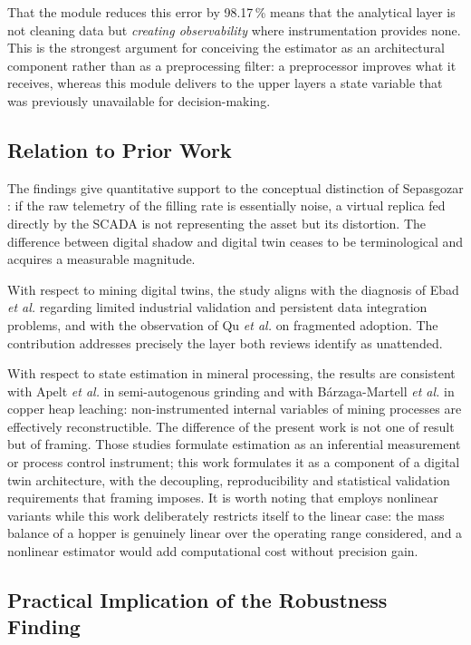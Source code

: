 \documentclass[conference]{IEEEtran}
\begin{document}
That the module reduces this error by 98.17\,\% means that the analytical layer
is not cleaning data but \emph{creating observability} where instrumentation
provides none. This is the strongest argument for conceiving the estimator as an
architectural component rather than as a preprocessing filter: a preprocessor
improves what it receives, whereas this module delivers to the upper layers a
state variable that was previously unavailable for decision-making.

\subsection{Relation to Prior Work}

The findings give quantitative support to the conceptual distinction of
Sepasgozar \cite{sepasgozar2021}: if the raw telemetry of the filling rate is
essentially noise, a virtual replica fed directly by the SCADA is not
representing the asset but its distortion. The difference between digital shadow
and digital twin ceases to be terminological and acquires a measurable
magnitude.

With respect to mining digital twins, the study aligns with the diagnosis of
Ebad \textit{et al.} \cite{ebad2026} regarding limited industrial validation and
persistent data integration problems, and with the observation of Qu \textit{et
al.} \cite{qu2023} on fragmented adoption. The contribution addresses precisely
the layer both reviews identify as unattended.

With respect to state estimation in mineral processing, the results are
consistent with Apelt \textit{et al.} \cite{apelt2002} in semi-autogenous
grinding and with B\'arzaga-Martell \textit{et al.} \cite{barzaga2025} in copper
heap leaching: non-instrumented internal variables of mining processes are
effectively reconstructible. The difference of the present work is not one of
result but of framing. Those studies formulate estimation as an inferential
measurement or process control instrument; this work formulates it as a
component of a digital twin architecture, with the decoupling, reproducibility
and statistical validation requirements that framing imposes. It is worth noting
that \cite{barzaga2025} employs nonlinear variants while this work deliberately
restricts itself to the linear case: the mass balance of a hopper is genuinely
linear over the operating range considered, and a nonlinear estimator would add
computational cost without precision gain.

\subsection{Practical Implication of the Robustness Finding}
\end{document}
